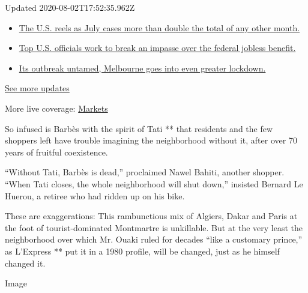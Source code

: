 Updated 2020-08-02T17:52:35.962Z

\begin{itemize}
\tightlist
\item
  \href{https://www.nytimes3xbfgragh.onion/2020/08/01/world/coronavirus-covid-19.html?action=click\&pgtype=Article\&state=default\&region=MAIN_CONTENT_1\&context=storylines_live_updates\#link-34047410}{The
  U.S. reels as July cases more than double the total of any other
  month.}
\item
  \href{https://www.nytimes3xbfgragh.onion/2020/08/01/world/coronavirus-covid-19.html?action=click\&pgtype=Article\&state=default\&region=MAIN_CONTENT_1\&context=storylines_live_updates\#link-780ec966}{Top
  U.S. officials work to break an impasse over the federal jobless
  benefit.}
\item
  \href{https://www.nytimes3xbfgragh.onion/2020/08/01/world/coronavirus-covid-19.html?action=click\&pgtype=Article\&state=default\&region=MAIN_CONTENT_1\&context=storylines_live_updates\#link-2bc8948}{Its
  outbreak untamed, Melbourne goes into even greater lockdown.}
\end{itemize}

\href{https://www.nytimes3xbfgragh.onion/2020/08/01/world/coronavirus-covid-19.html?action=click\&pgtype=Article\&state=default\&region=MAIN_CONTENT_1\&context=storylines_live_updates}{See
more updates}

More live coverage:
\href{https://www.nytimes3xbfgragh.onion/live/2020/07/31/business/stock-market-today-coronavirus?action=click\&pgtype=Article\&state=default\&region=MAIN_CONTENT_1\&context=storylines_live_updates}{Markets}

So infused is Barbès with the spirit of Tati ** that residents and the
few shoppers left have trouble imagining the neighborhood without it,
after over 70 years of fruitful coexistence.

``Without Tati, Barbès is dead,'' proclaimed Nawel Bahiti, another
shopper. ``When Tati closes, the whole neighborhood will shut down,''
insisted Bernard Le Huerou, a retiree who had ridden up on his bike.

These are exaggerations: This rambunctious mix of Algiers, Dakar and
Paris at the foot of tourist-dominated Montmartre is unkillable. But at
the very least the neighborhood over which Mr. Ouaki ruled for decades
``like a customary prince,'' as L'Express ** put it in a 1980 profile,
will be changed, just as he himself changed it.

Image

